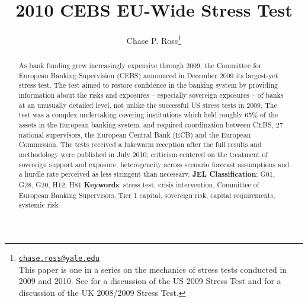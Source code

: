 \documentclass[12pt]{article}
\begin{document}
\lhead{ }

\renewcommand{\headrulewidth}{0.0pt}
\renewcommand{\footrulewidth}{0.0pt}


\title{2010 CEBS EU-Wide Stress Test}%
\author{Chase P. Ross\thanks{\texttt{\href{mailto:chase.ross@yale.edu}{chase.ross@yale.edu}} \\ This paper is one in a series on the mechanics of stress tests conducted in 2009 and 2010. See \citet{Ross2016a} for a discussion of the US 2009 Stress Test and \citet{Ross2016b} for a discussion of the UK 2008/2009 Stress Test.}}



\maketitle

\begin{abstract}
As bank funding grew increasingly expensive through 2009, the Committee for European Banking Supervision (CEBS) announced in December 2009 its largest-yet stress test. The test aimed to restore confidence in the banking system by providing information about the risks and exposures -- especially sovereign exposures -- of banks at an unusually detailed level, not unlike the successful US stress tests in 2009. The test was a complex undertaking covering institutions which held roughly 65\% of the assets in the European banking system, and required coordination between CEBS, 27 national supervisors, the European Central Bank (ECB) and the European Commission. The tests received a lukewarm reception after the full results and methodology were published in July 2010; criticism centered on the treatment of sovereign support and exposure, heterogeneity across scenario forecast assumptions and a hurdle rate perceived as less stringent than necessary.
\newline
\newline
\textbf{JEL Classification}: G01, G28, G20, H12, H81
\newline
\textbf{Keywords}: stress test, crisis intervention, Committee of European Banking Supervisors, Tier 1 capital, sovereign risk, capital requirements, systemic risk

\end{abstract}
\newpage
\tableofcontents
\newpage
\end{document}
